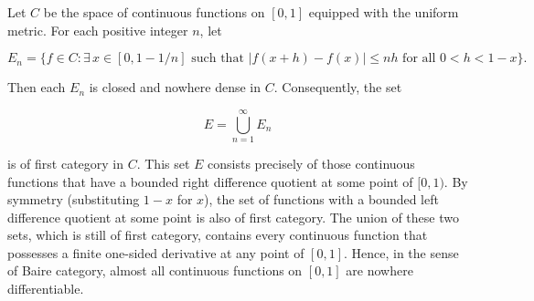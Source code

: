 Let $C$ be the space of continuous functions on $[0, 1]$ equipped with the uniform metric. For each positive integer $n$, let

$$E_n = \{ f \in C : \exists\, x \in [0, 1 - 1/n] \text{ such that } |f(x + h) - f(x)| \leq nh \text{ for all } 0 < h < 1 - x \}.$$

Then each $E_n$ is closed and nowhere dense in $C$. Consequently, the set

$$E = \bigcup_{n=1}^{\infty} E_n$$

is of first category in $C$. This set $E$ consists precisely of those continuous functions that have a bounded right difference quotient at some point of $[0, 1)$. By symmetry (substituting $1 - x$ for $x$), the set of functions with a bounded left difference quotient at some point is also of first category. The union of these two sets, which is still of first category, contains every continuous function that possesses a finite one-sided derivative at any point of $[0, 1]$. Hence, in the sense of Baire category, almost all continuous functions on $[0, 1]$ are nowhere differentiable.
